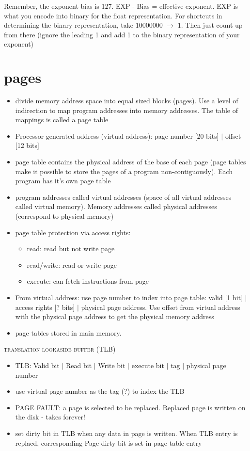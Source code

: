 \documentclass{article}
\begin{document}
Remember, the exponent bias is 127. EXP - Bias = effective exponent. EXP is what you encode into binary for the float representation. For shortcuts in determining the binary representation, take 10000000 $\rightarrow$ 1. Then just count up from there (ignore the leading 1 and add 1 to the binary representation of your exponent)
\section{pages} %
\label{sec:pages}
\begin{itemize}
	\item divide memory address space into equal sized blocks (pages). Use a level of indirection to map program addresses into memory addresses. The table of mappings is called a page table
	\item Processor-generated address (virtual address): page number [20 bits] $|$ offset [12 bits]
	\item page table contains the physical address of the base of each page (page tables make it possible to store the pages of a program non-contiguously). Each program has it's own page table
	\item program addresses called virtual addresses (space of all virtual addresses called virtual memory). Memory addresses called physical addresses (correspond to physical memory)
	\item page table protection via access rights:
	\begin{itemize}
		\item read: read but not write page
		\item read/write: read or write page
		\item execute: can fetch instructions from page
	\end{itemize}
	\item From virtual address: use page number to index into page table: valid [1 bit] $|$ access rights [? bits] $|$ physical page address. Use offset from virtual address with the physical page address to get the physical memory address
	\item page tables stored in main memory. 
\end{itemize}
\begin{center}\textsc{translation lookaside buffer (TLB)}\end{center} 
	\begin{itemize}
		\item TLB: Valid bit $|$ Read bit $|$ Write bit $|$ execute bit $|$ tag $|$ physical page number
		\item use virtual page number as the tag (?) to index the TLB
		\item PAGE FAULT: a page is selected to be replaced. Replaced page is written on the disk - takes forever!
		\item set dirty bit in TLB when any data in page is written. When TLB entry is replacd, corresponding Page dirty bit is set in page table entry
	\end{itemize}
\end{document}
